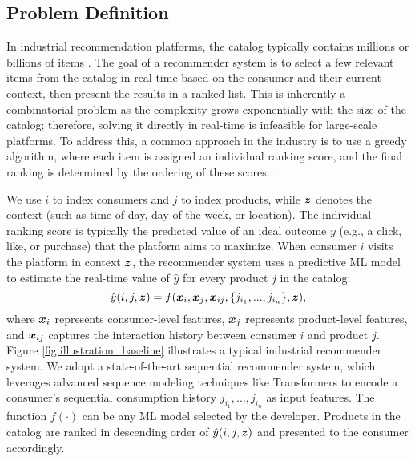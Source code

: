 
\subsection{Problem Definition}  
\label{sec:framework_probdefn}

In industrial recommendation platforms, the catalog typically contains millions or billions of items \citep{covington2016deep}. The goal of a recommender system is to select a few relevant items from the catalog in real-time based on the consumer and their current context, then present the results in a ranked list. This is inherently a combinatorial problem as the complexity grows exponentially with the size of the catalog; therefore, solving it directly in real-time is infeasible for large-scale platforms. To address this, a common approach in the industry is to use a greedy algorithm, where each item is assigned an individual ranking score, and the final ranking is determined by the ordering of these scores \citep{liu2009learning}.

We use $i$ to index consumers and $j$ to index products, while ${\bm{z}}$ denotes the context (such as time of day, day of the week, or location). The individual ranking score is typically the predicted value of an ideal outcome $y$ (e.g., a click, like, or purchase) that the platform aims to maximize. When consumer $i$ visits the platform in context ${\bm{z}}$, the recommender system uses a predictive ML model to estimate the real-time value of $\hat{y}$ for every product $j$ in the catalog:
\begin{equation}
  \label{eqn:ml_recsys}
  \hat{y}(i,j,{\bm{z}}) = f({\bm{x}}_i, {\bm{x}}_j, {\bm{x}}_{ij}, \{j_{i_1},...,j_{i_n}\}, {\bm{z}}),
\end{equation}
where ${\bm{x}}_{i}$ represents consumer-level features, ${\bm{x}}_{j}$ represents product-level features, and ${\bm{x}}_{ij}$ captures the interaction history between consumer $i$ and product $j$. Figure \ref{fig:illustration_baseline} illustrates a typical industrial recommender system. We adopt a state-of-the-art sequential recommender system, which leverages advanced sequence modeling techniques like Transformers \citep{vaswani2017attention} to encode a consumer's sequential consumption history ${j_{i_1},...,j_{i_n}}$ as input features. The function $f(\cdot)$ can be any ML model selected by the developer. Products in the catalog are ranked in descending order of $\hat{y}(i,j,{\bm{z}})$ and presented to the consumer accordingly.

